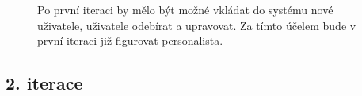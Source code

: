 \documentclass[a4paper,11pt]{article}
\begin{document}
    \begin{figure}[ht]
	\begin{center}
	\end{center}
	\caption{Po první iteraci by mělo být možné vkládat do systému nové uživatele, uživatele odebírat a upravovat. Za tímto účelem bude v první iteraci již figurovat personalista.}
	\label{pic2} 
    \end{figure}

    \newpage
    \subsection*{2. iterace}
\end{document}
